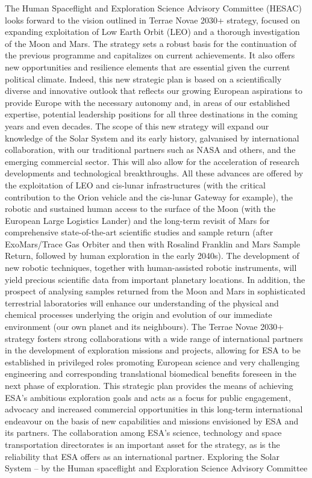 \documentclass[12pt]{article}
\begin{document}
The Human Spaceflight and Exploration Science Advisory Committee (HESAC) looks forward to the vision outlined in Terrae Novae 2030+ strategy, focused on expanding exploitation of Low Earth Orbit (LEO) and a thorough investigation of the Moon and Mars. The strategy sets a robust basis for the continuation of the previous programme and capitalizes on current achievements. It also offers new opportunities and resilience elements that are essential given the current political climate. Indeed, this new strategic plan is based on a scientifically diverse and innovative outlook that reflects our growing European aspirations to provide Europe with the necessary autonomy and, in areas of our established expertise, potential leadership positions for all three destinations in the coming years and even decades. The scope of this new strategy will expand our knowledge of the Solar System and its early history, galvanised by international collaboration, with our traditional partners such as NASA and others, and the emerging commercial sector. This will also allow for the acceleration of research developments and technological breakthroughs. All these advances are offered by the exploitation of LEO and cis-lunar infrastructures (with the critical contribution to the Orion vehicle and the cis-lunar Gateway for example), the robotic and sustained human access to the surface of the Moon (with the European Large Logistics Lander) and the long-term revisit of Mars for comprehensive state-of-the-art scientific studies and sample return (after ExoMars/Trace Gas Orbiter and then with Rosalind Franklin and Mars Sample Return, followed by human exploration in the early 2040s). The development of new robotic techniques, together with human-assisted robotic instruments, will yield precious scientific data from important planetary locations. In addition, the prospect of analysing samples returned from the Moon and Mars in sophisticated terrestrial laboratories will enhance our understanding of the physical and chemical processes underlying the origin and evolution of our immediate environment (our own planet and its neighbours). The Terrae Novae 2030+ strategy fosters strong collaborations with a wide range of international partners in the development of exploration missions and projects, allowing for ESA to be established in privileged roles promoting European science and very challenging engineering and corresponding translational biomedical benefits foreseen in the next phase of exploration. This strategic plan provides the means of achieving ESA’s ambitious exploration goals and acts as a focus for public engagement, advocacy and increased commercial opportunities in this long-term international endeavour on the basis of new capabilities and missions envisioned by ESA and its partners. The collaboration among ESA’s science, technology and space transportation directorates is an important asset for the strategy, as is the reliability that ESA offers as an international partner. Exploring the Solar System – by the Human spaceflight and Exploration Science Advisory Committee
\end{document}
